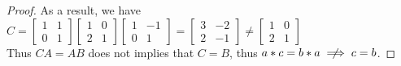 \documentclass{article}
\theoremstyle{MyNonumberplain}
\theoremstyle{break}
\newtheorem*{proof}{Proof. }
\theoremstyle{break}
\theoremstyle{break}
\theoremstyle{definition}
\theoremstyle{break}
\begin{document}
\begin{warnbox}
\begin{prfbox}
\begin{proof}
                As a result, we have $C = \left[\begin{array}{cc}
                  1 & 1\\
                  0 & 1
                \end{array}\right] \left[\begin{array}{cc}
                  1 & 0\\
                  2 & 1
                \end{array}\right] \left[\begin{array}{cc}
                  1 & - 1\\
                  0 & 1
                \end{array}\right] = \left[\begin{array}{cc}
                  3 & - 2\\
                  2 & - 1
                \end{array}\right] \neq \left[\begin{array}{cc}
                  1 & 0\\
                  2 & 1
                \end{array}\right]$\\
                
                Thus $C A = A B$ does not implies that $C = B$, thus $a \ast c = b \ast a
                \centernot\implies c = b$.
            \end{proof}
        \end{prfbox}
        
\end{warnbox}
\end{document}
